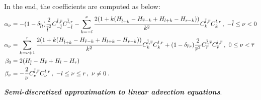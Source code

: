 In the end, the coefficients are computed as below:
\begin{subequations}\label{eq:bg_hv_dx_coef}
  \begin{align}
    \label{eq:bg_hv_dx_coef_alpha_neg}
    \alpha_{\nu} &= -(1-\delta_{\bl l})\frac{2}{\bl^2}C^{\bl,\br}_{-\bl}C^{\bl,r}_{-\bl}-\sum_{k=-l}^{\nu}\frac{2(1+k(H_{\bl+k}-H_{\br-k}+H_{l+k}-H_{r-k}))}{k^2}C^{\bl,\br}_kC^{l,r}_k\,,\ -\bl\le\nu<0 \\
    \label{eq:bg_hv_dx_coef_alpha_pos}
    \alpha_{\nu} &= \sum_{k=\nu+1}^{r}\frac{2(1+k(H_{\bl+k}-H_{\br-k}+H_{l+k}-H_{r-k}))}{k^2}C^{\bl,\br}_kC^{l,r}_k+(1-\delta_{\br r})\frac{2}{\br^2}C^{\bl,\br}_{\br}C^{l,\br}_{\br}\,,\ 0\le\nu<\br \\
    \label{eq:bg_hv_dx_coef_beta_zero}
    \beta_0 &= 2(H_{\bl}-H_{\br}+H_l-H_r) \\
    \label{eq:bg_hv_dx_coef_beta_nzero}
    \beta_{\nu} &= -\frac{2}{\nu}C^{\bl,\br}_{\nu}C^{l,r}_{\nu}\,,\ -l\le\nu\le r\,,\ \nu\ne0\;.
  \end{align}
\end{subequations}

\medskip

\noindent
\textbf{\textit{Semi-discretized approximation to linear advection equations}}.

